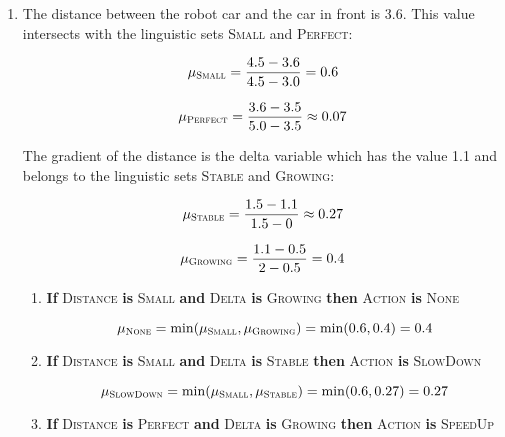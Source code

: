 \begin{enumerate}[label=\alph*)]
\item

The distance between the robot car and the car in front is 3.6. This value intersects with the linguistic sets \textsc{Small} and \textsc{Perfect}:

\begin{displaymath}
\mu_{\textsc{Small}} = \frac{4.5 - 3.6}{4.5 - 3.0} = 0.6
\end{displaymath}

\begin{displaymath}
\mu_{\textsc{Perfect}} = \frac{3.6 - 3.5}{5.0 - 3.5} \approx 0.07
\end{displaymath}

The gradient of the distance is the delta variable which has the value 1.1 and belongs to the linguistic sets \textsc{Stable} and \textsc{Growing}:

\begin{displaymath}
\mu_{\textsc{Stable}} = \frac{1.5 - 1.1}{1.5 - 0} \approx 0.27
\end{displaymath}

\begin{displaymath}
\mu_{\textsc{Growing}} = \frac{1.1 - 0.5}{2 - 0.5} = 0.4
\end{displaymath}

\begin{enumerate}[label=\textsc{Rule \arabic*}:]
\item \textbf{If} \textsc{Distance} \textbf{is} \textsc{Small} \textbf{and} \textsc{Delta} \textbf{is} \textsc{Growing} \textbf{then} \textsc{Action} \textbf{is} \textsc{None}

\begin{displaymath}
\mu_{\textsc{None}} = \min(\mu_{\textsc{Small}}, \mu_{\textsc{Growing}}) = \min(0.6, 0.4) = 0.4
\end{displaymath}

\item \textbf{If} \textsc{Distance} \textbf{is} \textsc{Small} \textbf{and} \textsc{Delta} \textbf{is} \textsc{Stable} \textbf{then} \textsc{Action} \textbf{is} \textsc{SlowDown}

\begin{displaymath}
\mu_{\textsc{SlowDown}} = \min(\mu_{\textsc{Small}}, \mu_{\textsc{Stable}}) = \min(0.6, 0.27) = 0.27
\end{displaymath}

\item \textbf{If} \textsc{Distance} \textbf{is} \textsc{Perfect} \textbf{and} \textsc{Delta} \textbf{is} \textsc{Growing} \textbf{then} \textsc{Action} \textbf{is} \textsc{SpeedUp}


\end{enumerate}
\end{enumerate}
